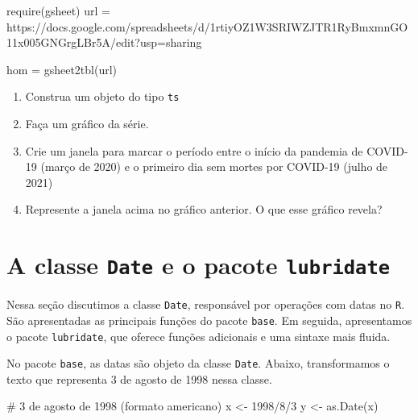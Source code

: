 \documentclass[
  letterpaper,
  DIV=11,
  numbers=noendperiod]{scrreprt}
\newenvironment{Shaded}{\begin{snugshade}}{\end{snugshade}}
\newcommand{\CommentTok}[1]{\textcolor[rgb]{0.37,0.37,0.37}{#1}}
\newcommand{\FunctionTok}[1]{\textcolor[rgb]{0.28,0.35,0.67}{#1}}
\newcommand{\NormalTok}[1]{\textcolor[rgb]{0.00,0.23,0.31}{#1}}
\newcommand{\OtherTok}[1]{\textcolor[rgb]{0.00,0.23,0.31}{#1}}
\newcommand{\StringTok}[1]{\textcolor[rgb]{0.13,0.47,0.30}{#1}}
\begin{document}
\begin{Shaded}
\begin{Highlighting}[]
\FunctionTok{require}\NormalTok{(gsheet)}
\NormalTok{url }\OtherTok{=} \StringTok{\textquotesingle{}https://docs.google.com/spreadsheets/d/1rtiyOZ1W3SRIWZJTR1RyBmxmnGO11x005GNGrgLBr5A/edit?usp=sharing\textquotesingle{}}

\NormalTok{hom }\OtherTok{=} \FunctionTok{gsheet2tbl}\NormalTok{(url)}
\end{Highlighting}
\end{Shaded}

\begin{enumerate}
\def\labelenumi{\arabic{enumi}.}
\item
  Construa um objeto do tipo \texttt{ts}
\item
  Faça um gráfico da série.
\item
  Crie um janela para marcar o período entre o início da pandemia de
  COVID-19 (março de 2020) e o primeiro dia sem mortes por COVID-19
  (julho de 2021)
\item
  Represente a janela acima no gráfico anterior. O que esse gráfico
  revela?
\end{enumerate}

\section{\texorpdfstring{A classe \texttt{Date} e o pacote
\texttt{lubridate}}{A classe Date e o pacote lubridate}}\label{a-classe-date-e-o-pacote-lubridate}

Nessa seção discutimos a classe \texttt{Date}, responsável por operações
com datas no \texttt{R}. São apresentadas as principais funções do
pacote \texttt{base}. Em seguida, apresentamos o pacote
\texttt{lubridate}, que oferece funções adicionais e uma sintaxe mais
fluida.

No pacote \texttt{base}, as datas são objeto da classe \texttt{Date}.
Abaixo, transformamos o texto que representa 3 de agosto de 1998 nessa
classe.

\begin{Shaded}
\begin{Highlighting}[]
\CommentTok{\# 3 de agosto de 1998 (formato americano)}
\NormalTok{x }\OtherTok{\textless{}{-}} \StringTok{\textquotesingle{}1998/8/3\textquotesingle{}}
\NormalTok{y }\OtherTok{\textless{}{-}} \FunctionTok{as.Date}\NormalTok{(x)}
\end{Highlighting}
\end{Shaded}
\end{document}
